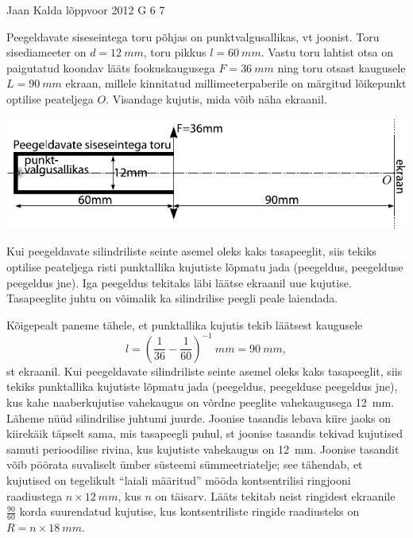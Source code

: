 {Jaan Kalda} %
{lõppvoor} %
{2012} %
{G 6} %
{7} %
{
\ifStatement
Peegeldavate siseseintega toru põhjas on punktvalgusallikas, vt joonist. Toru
sisediameeter on
$d=\SI{12}{mm}$, toru pikkus $l=\SI{60}{mm}$. Vastu toru lahtist otsa on
paigutatud koondav lääts fookuskaugusega $F=\SI{36}{mm}$ ning toru otsast
kaugusele  $L=\SI{90}{mm}$ ekraan, millele kinnitatud millimeeterpaberile
on märgitud lõikepunkt optilise peateljega $O$.
Visandage kujutis, mida võib näha ekraanil.

\begin{center}
\includegraphics[width=\textwidth]{2012-v3g-06-toru-valgusallikas-lxxts}
\end{center}
\fi


\ifHint
Kui peegeldavate silindriliste seinte asemel oleks kaks tasapeeglit, siis
tekiks optilise peateljega risti punktallika kujutiste lõpmatu jada (peegeldus, peegelduse peegeldus jne). Iga peegeldus tekitaks läbi läätse ekraanil uue kujutise. Tasapeeglite juhtu on võimalik ka silindrilise peegli peale laiendada.
\fi


\ifSolution
Kõigepealt paneme tähele, et punktallika kujutis tekib läätsest kaugusele
$$l=\left(\frac 1{36}-\frac 1{60}\right)^{-1}\SI{}{mm}=\SI{90}{mm},$$
st ekraanil. Kui peegeldavate silindriliste seinte asemel oleks kaks tasapeeglit, siis
tekiks punktallika kujutiste lõpmatu jada (peegeldus, peegelduse peegeldus jne), kus 
kahe naaberkujutise vahekaugus on võrdne peeglite vahekaugusega \SI{12}{mm}. 
Läheme nüüd silindrilise juhtumi juurde. Joonise tasandis lebava kiire jaoks on 
kiirekäik täpselt sama, mis tasapeegli puhul, st joonise tasandis tekivad kujutised samuti 
perioodilise rivina, kus kujutiste vahekaugus on \SI{12}{mm}. Joonise tasandit võib pöörata suvaliselt
ümber süsteemi sümmeetriatelje; see tähendab, et kujutised on tegelikult \enquote{laiali määritud} mööda kontsentrilisi
ringjooni raadiustega $n\times\SI{12}{mm}$, kus $n$ on täisarv. Lääts tekitab neist ringidest 
ekraanile $\frac{90}{60}$ korda suurendatud kujutise, 
kus kontsentriliste ringide raadiusteks on $R=n\times \SI{18}{mm}$.
\fi


}
